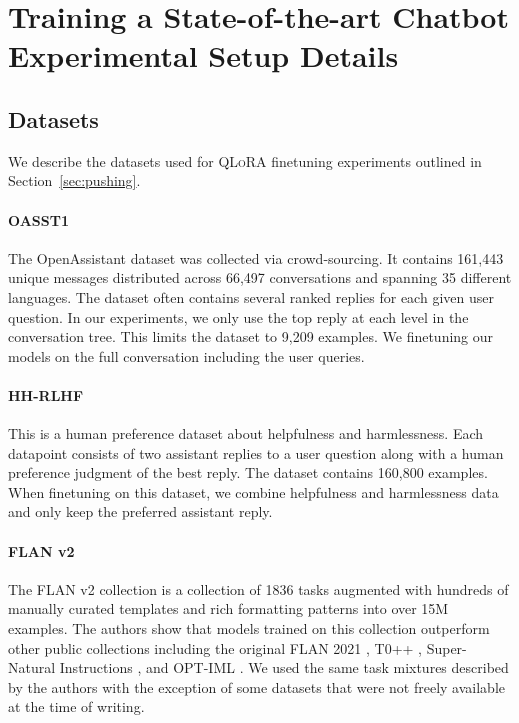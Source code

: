 \documentclass{article}
\newcommand{\method}{\textsc{QLoRA}\xspace}
\begin{document}
\section{Training a State-of-the-art Chatbot Experimental Setup Details}
\label{app:chatbot}

\subsection{Datasets}
We describe the datasets used for \method finetuning experiments outlined in Section~\ref{sec:pushing}. 

\paragraph{OASST1} The OpenAssistant dataset \citep{kopf2023openassistant} was collected via crowd-sourcing. It contains 161,443 unique messages distributed across 66,497 conversations and spanning 35 different languages. The dataset often contains several ranked replies for each given user question. In our experiments, we only use the top reply at each level in the conversation tree. This limits the dataset to 9,209 examples. We finetuning our models on the full conversation including the user queries. 
\paragraph{HH-RLHF} This is a human preference dataset about helpfulness and harmlessness. Each datapoint consists of two assistant replies to a user question along with a human preference judgment of the best reply. The dataset contains 160,800 examples. When finetuning on this dataset, we combine helpfulness and harmlessness data and only keep the preferred assistant reply. 
\paragraph{FLAN v2} The FLAN v2 collection \citep{longpre2023flan} is a collection of 1836 tasks augmented with hundreds of manually curated templates and rich formatting patterns into over 15M examples. The authors show that models trained on this collection outperform other public collections including the original FLAN 2021 \citep{wei2021finetuned}, T0++ \citep{sanh2021multitask}, Super-Natural Instructions \citep{supernaturalinstructions}, and OPT-IML \citep{iyer2022opt}. We used the same task mixtures described by the authors with the exception of some datasets that were not freely available at the time of writing. 
\end{document}
